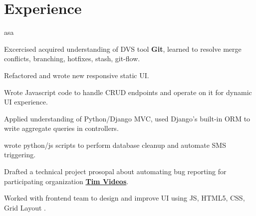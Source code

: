 \documentclass[]{deedy-resume-openfont}
\begin{document}
\begin{minipage}[t]{0.66\textwidth}


\section{Experience}

\vspace{\topsep} %
\begin{tightemize}
\item  asa
\end{tightemize}
\sectionsep

\vspace{\topsep} %
\begin{tightemize}
\item  Excercised acquired understanding of DVS tool \textbf{Git}, learned to resolve merge conflicts, branching, hotfixes, stash, git-flow.
\item Refactored and wrote new responsive static UI.
\item Wrote Javascript code to handle CRUD endpoints and operate on it for dynamic UI experience.
\item Applied understanding of Python/Django MVC, used Django's built-in ORM to
  write aggregate queries in controllers.
\item wrote python/js scripts to perform database cleanup and automate SMS triggering.
\end{tightemize}
\sectionsep

\begin{tightemize}
\item Drafted a technical project prosopal about automating bug reporting
  for participating organization \href{http://code.timvideos.us/home/}{\textbf{Tim Videos}}.
\end{tightemize}
\sectionsep

\begin{tightemize}
\item Worked with frontend team to design and improve UI using JS, HTML5, CSS, Grid Layout .
\end{tightemize}
\sectionsep


\end{minipage}
\end{document}
